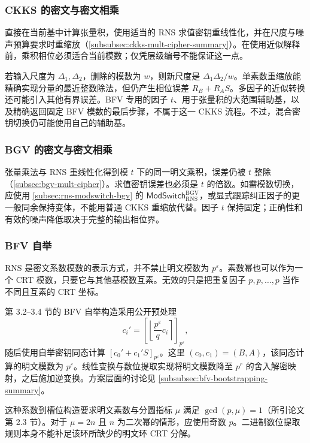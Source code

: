 \subsubsection{CKKS 的密文与密文相乘}
\label{subsubsec:rns-cipher-mult-ckks}

直接在当前基中计算张量积，使用适当的 RNS 求值密钥重线性化，并在尺度与噪声预算要求时重缩放（\autoref{subsubsec:ckks-mult-cipher-summary}）。在使用近似解释前，乘积相位必须适合当前模数；仅凭层级编号不能保证这一点。

若输入尺度为 $\Delta_1,\Delta_2$，删除的模数为 $w$，则新尺度是 $\Delta_1\Delta_2/w$。单素数重缩放能精确实现分量的最近整数除法，但仍产生相位误差 $R_B+R_AS$。多因子的近似转换还可能引入其他有界误差。BFV 专用的因子 $t$、用于张量积的大范围辅助基，以及精确返回固定 BFV 模数的最后步骤，不属于这一 CKKS 流程。不过，混合密钥切换仍可能使用自己的辅助基。


\subsubsection{BGV 的密文与密文相乘}
\label{subsubsec:rns-cipher-mult-bgv}

张量乘法与 RNS 重线性化得到模 $t$ 下的同一明文乘积，误差仍被 $t$ 整除（\autoref{subsec:bgv-mult-cipher}）。求值密钥误差也必须是 $t$ 的倍数。如需模数切换，应使用 \autoref{subsec:rns-modswitch-bgv} 的 $\textsf{ModSwitch}_{\mathrm{RNS}}^{\mathrm{BGV}}$，或显式跟踪纠正因子的更一般同余保持变体，不能用普通 CKKS 重缩放代替。因子 $t$ 保持固定；正确性和有效的噪声降低取决于完整的输出相位界。


\subsubsection{BFV 自举}
\label{subsubsec:rns-bfv-bootstrapping}

RNS 是密文系数模数的表示方式，并不禁止明文模数为 $p^\varepsilon$。素数幂也可以作为一个 CRT 模数，只要它与其他基模数互素。无效的只是把重复因子 $p,p,\ldots,p$ 当作不同且互素的 CRT 坐标。

\cite{cryptoeprint:2022/1363} 第 3.2--3.4 节的 BFV 自举构造采用公开预处理
\[
c_i'=\left[\left\lfloor\frac{p^\varepsilon}{q}c_i\right\rceil\right]_{p^\varepsilon},
\]
随后使用自举密钥同态计算 $[c_0'+c_1'S]_{p^\varepsilon}$。这里 $(c_0,c_1)=(B,A)$，该同态计算的明文模数为 $p^\varepsilon$。线性变换与数位提取实现将明文模数降至 $p^r$ 的舍入解密映射，之后施加逆变换。方案层面的讨论见 \autoref{subsubsec:bfv-bootstrapping-summary}。

这种系数到槽位构造要求明文素数与分圆指标 $\mu$ 满足 $\gcd(p,\mu)=1$（所引论文第 2.3 节）。对于 $\mu=2n$ 且 $n$ 为二次幂的情形，应使用奇数 $p$。二进制数位提取规则本身不能补足该环所缺少的明文环 CRT 分解。

